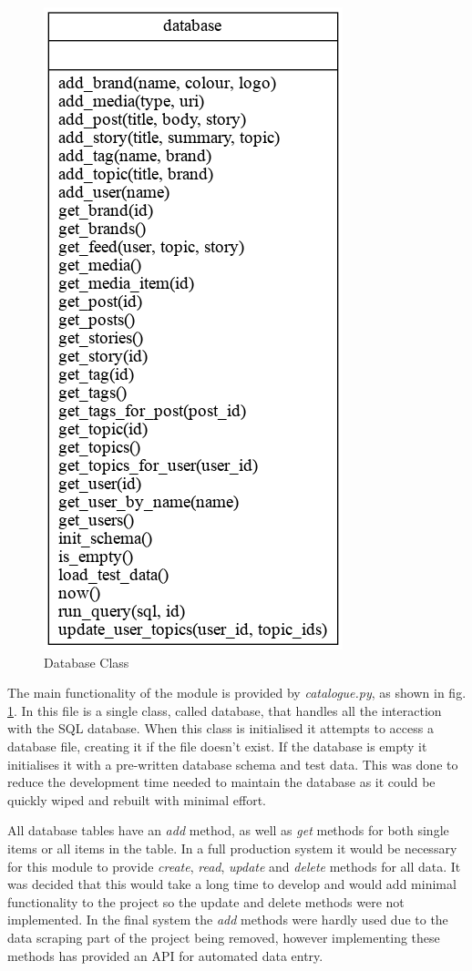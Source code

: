 \documentclass[12pt,titlepage]{article}
\begin{document}
  \begin{figure}[ht]
    \centering
    \includegraphics[height=\textheight/3]{../img/catalogue.png}
    \caption{Database Class}
    \label{fig:catalogue}
  \end{figure}

  The main functionality of the module is provided by \textit{catalogue.py}, as
  shown in fig. \ref{fig:catalogue}. In this file is a single class, called database,
  that handles all the interaction with the SQL database. When this class is
  initialised it attempts to access a database file, creating it if the file
  doesn't exist. If the database is empty it initialises it with a pre-written
  database schema and test data. This was done to reduce the development time
  needed to maintain the database as it could be quickly wiped and rebuilt with
  minimal effort.

  All database tables have an \textit{add} method, as well as \textit{get}
  methods for both single items or all items in the table. In a full production
  system it would be necessary for this module to provide \textit{create},
  \textit{read}, \textit{update} and \textit{delete} methods for all data. It
  was decided that this would take a long time to develop and would add minimal
  functionality to the project so the update and delete methods were not
  implemented. In the final system the \textit{add} methods were hardly used due
  to the data scraping part of the project being removed, however implementing
  these methods has provided an API for automated data entry.
\end{document}
